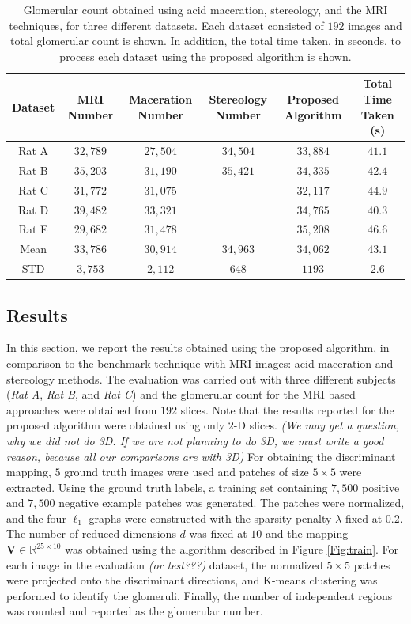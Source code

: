 \begin{table}[t]
 \renewcommand{\arraystretch}{1.4}
\centering
\caption{Glomerular count obtained using acid maceration, stereology, and the MRI techniques, for three different datasets. Each dataset consisted of $192$ images and total glomerular count is shown. In addition, the total time taken, in seconds, to process each dataset using the proposed algorithm is shown.}
\begin{tabular}{|c|c|c|c|c|c|}
\hline
\textbf{Dataset}&\textbf{MRI Number \cite{beeman2011measuring}}&\textbf{Maceration Number}&\textbf{Stereology Number}&\textbf{Proposed Algorithm}&\textbf{Total Time Taken (s)} \\
\hline
\hline
Rat A&$32,789$&$27,504$&$34,504$&$33,884$&$41.1$ \\
Rat B&$35,203$&$31,190$&$35,421$&$34,335$&$42.4$ \\
Rat C&$31,772$&$31,075$&&$32,117$&$44.9$ \\
Rat D&$39,482$&$33,321$&&$34,765$&$40.3$ \\
Rat E&$29,682$&$31,478$&&$35,208$&$46.6$ \\
\hline
Mean&$33,786$&$30,914$&$34,963$&$34,062$&$43.1$ \\
STD&$3,753$&$2,112$&$648$&$1193$&$2.6$\\
\hline
\end{tabular}
\label{Table:count}
\end{table}

\subsection{Results}
\label{sec:res}
In this section, we report the results obtained using the proposed algorithm, in comparison to the benchmark technique with MRI images: acid maceration and stereology methods. The evaluation was carried out with three different subjects (\textit{Rat A}, \textit{Rat B}, and \textit{Rat C}) and the glomerular count for the MRI based approaches were obtained from $192$ slices. Note that the results reported for the proposed algorithm were obtained using only $2$-D slices. \textit{(We may get a question, why we did not do 3D. If we are not planning to do 3D, we must write a good reason, because all our comparisons are with 3D)} For obtaining the discriminant mapping, $5$ ground truth images were used and patches of size $5 \times 5$ were extracted. Using the ground truth labels, a training set containing $7,500$ positive and $7,500$ negative example patches was generated. The patches were normalized, and the four $\ell_1$ graphs were constructed with the sparsity penalty $\lambda$ fixed at $0.2$. The number of reduced dimensions $d$ was fixed at $10$ and the mapping $\mathbf{V} \in \mathbb{R}^{25 \times 10}$ was obtained using the algorithm described in Figure \ref{Fig:train}. For each image in the evaluation \textit{(or test???)} dataset, the normalized $5 \times 5$ patches were projected onto the discriminant directions, and K-means clustering was performed to identify the glomeruli. Finally, the number of independent regions was counted and reported as the glomerular number.

